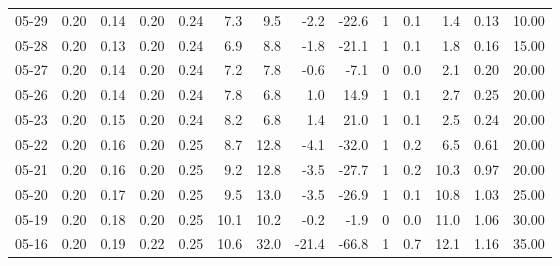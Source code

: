 \begin{threeparttable}
{\begin{tabular}{lrrrrrrrrrrrrr}
  05-29 &          0.20 &          0.14 &          0.20 &        0.24 &                 7.3 &                 9.5 &       -2.2 &        -22.6 &              1 &                 0.1 &              1.4 &            0.13 &                  10.00 \\
  05-28 &          0.20 &          0.13 &          0.20 &        0.24 &                 6.9 &                 8.8 &       -1.8 &        -21.1 &              1 &                 0.1 &              1.8 &            0.16 &                  15.00 \\
  05-27 &          0.20 &          0.14 &          0.20 &        0.24 &                 7.2 &                 7.8 &       -0.6 &         -7.1 &              0 &                 0.0 &              2.1 &            0.20 &                  20.00 \\
  05-26 &          0.20 &          0.14 &          0.20 &        0.24 &                 7.8 &                 6.8 &        1.0 &         14.9 &              1 &                 0.1 &              2.7 &            0.25 &                  20.00 \\
  05-23 &          0.20 &          0.15 &          0.20 &        0.24 &                 8.2 &                 6.8 &        1.4 &         21.0 &              1 &                 0.1 &              2.5 &            0.24 &                  20.00 \\
  05-22 &          0.20 &          0.16 &          0.20 &        0.25 &                 8.7 &                12.8 &       -4.1 &        -32.0 &              1 &                 0.2 &              6.5 &            0.61 &                  20.00 \\
  05-21 &          0.20 &          0.16 &          0.20 &        0.25 &                 9.2 &                12.8 &       -3.5 &        -27.7 &              1 &                 0.2 &             10.3 &            0.97 &                  20.00 \\
  05-20 &          0.20 &          0.17 &          0.20 &        0.25 &                 9.5 &                13.0 &       -3.5 &        -26.9 &              1 &                 0.1 &             10.8 &            1.03 &                  25.00 \\
  05-19 &          0.20 &          0.18 &          0.20 &        0.25 &                10.1 &                10.2 &       -0.2 &         -1.9 &              0 &                 0.0 &             11.0 &            1.06 &                  30.00 \\
  05-16 &          0.20 &          0.19 &          0.22 &        0.25 &                10.6 &                32.0 &      -21.4 &        -66.8 &              1 &                 0.7 &             12.1 &            1.16 &                  35.00 \\

\end{tabular}}
\end{threeparttable}
